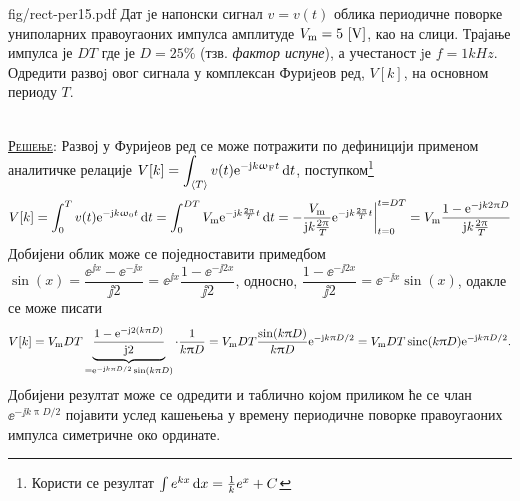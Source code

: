 \begin{slikaDesno}{fig/rect-per15.pdf}
    \PID\label{ID:rect_pulse_train_FS} 
    Дат jе напонски сигнал $v = v(t)$ облика периодичне поворке униполарних правоугаоних 
    импулса амплитуде ${V_{\rm m} = 5\,\left[\mathrm{V}\right]}$, као на слици. Трајање импулса је $DT$ где је 
$D = 25\%$ (тзв. \textit{фактор испуне}), а учестаност jе $f = 1\unit{kHz}$. 
Одредити развоj овог сигнала у комплексан Фуриjеов ред, $V[k]$, на основном периоду $T$.
\end{slikaDesno} \\

\textsc{\underline{Решење}}: Развој у Фуријеов ред се може потражити по дефиницији применом 
аналитичке релације 
$\displaystyle V[k] = \int_{\langle T \rangle} v(t) {\rm e}^{-{\rm j} k \upomega_{\rm F} t} \, {\rm d} t$, 
поступком\footnote{Користи се резултат $\int e^{kx} \, {\rm d} x = \frac{1}{k} e^x + C$}
\begin{align}
    V[k] = \int_{0}^T v(t) {\rm e}^{-{\rm j} k \upomega_{\rm 0} t} \, {\rm d} t 
         = \int_{0}^{DT}  V_{\rm m} {\rm e}^{-{\rm j} k \frac{2\uppi}{T} t} \, {\rm d} t
         = -\dfrac{V_{\rm m}}{{\rm j} k \frac{2\uppi}{T}} 
         {\rm e}^{-{\rm j} k \frac{2\uppi}{T} t}\bigg|_{t = 0}^{t = DT}
         = V_{\rm m}\dfrac{
            1
            -
            {\rm e}^{-{\rm j} k 2\uppi D}
         }{{\rm j} k \frac{2\uppi}{T}} 
\end{align}
Добијени облик може се поједноставити примедбом 
$\sin(x) = \dfrac{\ee^{\jj x} - \ee^{-\jj x}}{\jj 2} = \ee^{\jj x} \dfrac{1 - \ee^{-\jj 2x}}{\jj 2}$,
односно, 
$\dfrac{1 - \ee^{-\jj 2x}}{\jj 2} = \ee^{-\jj x} \sin(x) $,
одакле се може писати
\begin{align}
    V[k] = V_{\rm m}DT 
     \underbrace{
     \dfrac{
        1
        -
        {\rm e}^{-{\rm j} 2 (k \uppi D) }
     }{{\rm j} 2 }}_{ = {\rm e}^{-{\rm j} k \uppi D/2} \sin(k\uppi D) }
     \cdot 
     \dfrac{1}{k \uppi D} 
     = V_{\rm m} D T \dfrac{\sin(k\uppi D)}{k\uppi D} {\rm e}^{-{\rm j} k \uppi D/2} 
     = V_{\rm m} D T \operatorname{sinc}(k \uppi D) {\rm e}^{-{\rm j} k \uppi D/2}.
\end{align}
Добијени резултат може се одредити и таблично којом приликом ће се члан 
$\ee^{-\jj k \uppi D/2}$ појавити услед кашењења у времену периодичне поворке правоугаоних 
импулса симетричне око ординате. 
